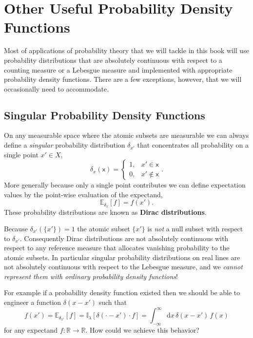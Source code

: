 \documentclass[
  letterpaper,
  DIV=11,
  numbers=noendperiod]{scrartcl}
\begin{document}
\hypertarget{other-useful-probability-density-functions}{%
\section{Other Useful Probability Density
Functions}\label{other-useful-probability-density-functions}}

Most of applications of probability theory that we will tackle in this
book will use probability distributions that are absolutely continuous
with respect to a counting measure or a Lebesgue measure and implemented
with appropriate probability density functions. There are a few
exceptions, however, that we will occasionally need to accommodate.

\hypertarget{singular-probability-density-functions}{%
\subsection{Singular Probability Density
Functions}\label{singular-probability-density-functions}}

On any measurable space where the atomic subsets are measurable we can
always define a \emph{singular} probability distribution \(\delta_{x'}\)
that concentrates all probability on a single point \(x' \in X\), \[
\delta_{x}(\mathsf{x}) =
\left\{
\begin{array}{rr}
1, & x' \in \mathsf{x} \\
0, & x' \notin \mathsf{x}
\end{array}
\right. .
\] More generally because only a single point contributes we can define
expectation values by the point-wise evaluation of the expectand, \[
\mathbb{E}_{\delta_{x}} [f] = f(x').
\] These probability distributions are known as \textbf{Dirac
distributions}.

Because \(\delta_{x'}(\{ x' \}) = 1\) the atomic subset \(\{ x' \}\) is
\emph{not} a null subset with respect to \(\delta_{x'}\). Consequently
Dirac distributions are not absolutely continuous with respect to any
reference measure that allocates vanishing probability to the atomic
subsets. In particular singular probability distributions on real lines
are not absolutely continuous with respect to the Lebesgue measure, and
we \emph{cannot represent them with ordinary probability density
functions}!

For example if a probability density function existed then we should be
able to engineer a function \(\delta(x - x')\) such that \[
f(x')
= \mathbb{E}_{\delta_{x'}} [f]
= \mathbb{I}_{\lambda} [ \delta(\cdot - x') \cdot f]
= \int_{-\infty}^{\infty} \mathrm{d} x \, \delta(x - x') \, f(x)
\] for any expectand \(f: \mathbb{R} \rightarrow \mathbb{R}\). How could
we achieve this behavior?
\end{document}
